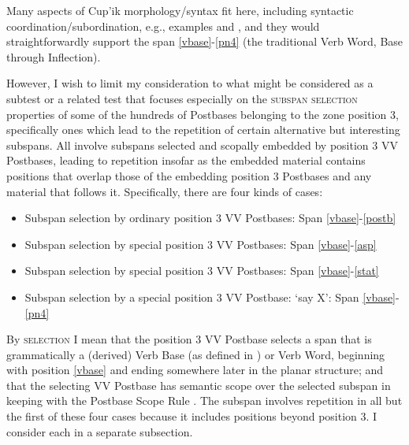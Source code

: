 \documentclass[output=paper]{langscibook}
\begin{document}
Many aspects of Cup'ik morphology/syntax fit here, including syntactic coordination/subordination, e.g., examples  and , and they would straightforwardly support the span \ref{vbase}-\ref{pn4} (the traditional Verb Word, Base through Inflection).

 However, I wish to limit my consideration to what might be considered as a subtest or a related test that focuses especially on the \textsc{subspan} \textsc{selection} properties of some of the hundreds of Postbases belonging to the zone position 3, specifically ones which lead to the repetition of certain alternative but interesting subspans. All involve subspans selected and scopally embedded by position 3 VV Postbases, leading to repetition insofar as the embedded material contains positions that overlap those of the embedding position 3 Postbases and any material that follows it. Specifically, there are four kinds of cases:

\begin{itemize}
\item 
Subspan selection by ordinary position 3 VV Postbases: Span \ref{vbase}-\ref{postb}
\item 
Subspan selection by special position 3 VV Postbases: Span \ref{vbase}-\ref{asp}
\item 
Subspan selection by special position 3 VV Postbases: Span \ref{vbase}-\ref{stat}
\item 
Subspan selection by a special position 3 VV Postbase: `say X': Span \ref{vbase}-\ref{pn4}
\end{itemize}

By \textsc{selection} I mean that the position 3 VV Postbase selects a span that is grammatically a (derived) Verb Base (as defined in ) or Verb Word, beginning with position \ref{vbase} and ending somewhere later in the planar structure; and that the selecting VV Postbase has semantic scope over the selected subspan in keeping with the Postbase Scope Rule . The subspan involves repetition in all but the first of these four cases because it includes positions beyond position 3. I consider each in a separate subsection.
\end{document}
